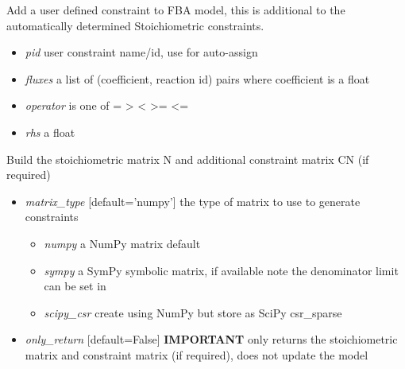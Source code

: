 \documentclass[a4paper,11pt,english]{sphinxmanual}
\begin{document}
\begin{fulllineitems}
\begin{fulllineitems}
\label{modules_doc:cbmpy.CBModel.Model.addUserConstraint}
Add a user defined constraint to FBA model, this is additional to the automatically determined Stoichiometric constraints.
\begin{itemize}
\item {} 
\emph{pid} user constraint name/id, use  for auto-assign

\item {} 
\emph{fluxes} a list of (coefficient, reaction id) pairs where coefficient is a float

\item {} 
\emph{operator} is one of = \textgreater{} \textless{} \textgreater{}= \textless{}=

\item {} 
\emph{rhs} a float

\end{itemize}

\end{fulllineitems}


\begin{fulllineitems}
\label{modules_doc:cbmpy.CBModel.Model.buildStoichMatrix}
Build the stoichiometric matrix N and additional constraint matrix CN (if required)
\begin{itemize}
\item {} 
\emph{matrix\_type} {[}default='numpy'{]} the type of matrix to use to generate constraints
\begin{itemize}
\item {} 
\emph{numpy} a NumPy matrix default

\item {} 
\emph{sympy} a SymPy symbolic matrix, if available note the denominator limit can be set in 

\item {} 
\emph{scipy\_csr} create using NumPy but store as SciPy csr\_sparse

\end{itemize}

\end{itemize}
\begin{itemize}
\item {} 
\emph{only\_return} {[}default=False{]} \textbf{IMPORTANT} only returns the stoichiometric matrix and constraint matrix (if required),
does not update the model


\end{itemize}
\end{fulllineitems}
\end{fulllineitems}
\end{document}
